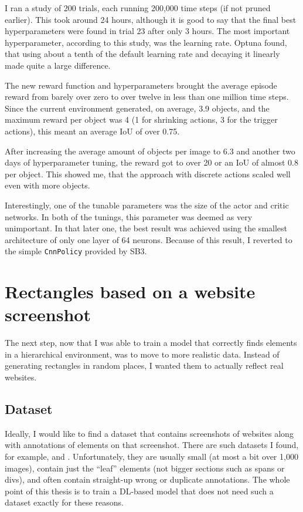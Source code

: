\documentclass[
  digital,     %
  oneside,     %
  nosansbold,  %
  nocolorbold, %
  lof,         %
  lot,         %
]{fithesis4}
\begin{document}
I ran a study of 200 trials, each running 200,000 time steps (if not pruned earlier). This took around 24 hours, although it is good to say that the final best hyperparameters were found in trial 23 after only 3 hours. The most important hyperparameter, according to this study, was the learning rate. Optuna found, that using about a tenth of the default learning rate and decaying it linearly made quite a large difference.

The new reward function and hyperparameters brought the average episode reward from barely over zero to over twelve in less than one million time steps. Since the current environment generated, on average, 3.9 objects, and the maximum reward per object was 4 (1 for shrinking actions, 3 for the trigger actions), this meant an average IoU of over 0.75.

After increasing the average amount of objects per image to 6.3 and another two days of hyperparameter tuning, the reward got to over 20 or an IoU of almost 0.8 per object. This showed me, that the approach with discrete actions scaled well even with more objects.

Interestingly, one of the tunable parameters was the size of the actor and critic networks. In both of the tunings, this parameter was deemed as very unimportant. In that later one, the best result was achieved using the smallest architecture of only one layer of 64 neurons. Because of this result, I reverted to the simple \texttt{CnnPolicy} provided by SB3.

\section{Rectangles based on a website screenshot}

The next step, now that I was able to train a model that correctly finds elements in a hierarchical environment, was to move to more realistic data. Instead of generating rectangles in random places, I wanted them to actually reflect real websites.

\subsection{Dataset}

Ideally, I would like to find a dataset that contains screenshots of websites along with annotations of elements on that screenshot. There are such datasets I found, for example, \cite{roboflow-dataset-1} and \cite{roboflow-dataset-2}. Unfortunately, they are usually small (at most a bit over 1,000 images), contain just the \enquote{leaf} elements (not bigger sections such as spans or divs), and often contain straight-up wrong or duplicate annotations. The whole point of this thesis is to train a DL-based model that does not need such a dataset exactly for these reasons.
\end{document}

